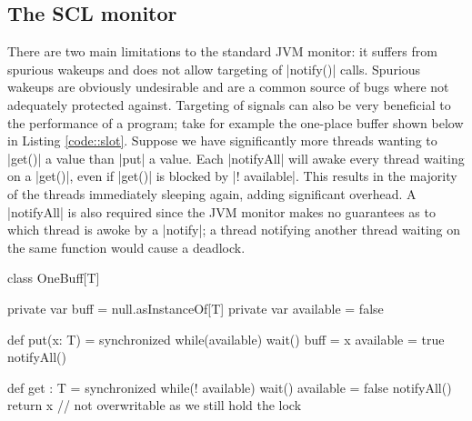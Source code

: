 \subsection{The SCL monitor}\label{section:SCLMonitor}
\inlineCSP

There are two main limitations to the standard JVM monitor: it suffers from spurious wakeups and does not allow targeting of |notify()| calls. Spurious wakeups are obviously undesirable and are a common source of bugs where not adequately protected against. Targeting of signals can also be very beneficial to the performance of a program; take for example the one-place buffer shown below in Listing \ref{code::slot}. Suppose we have significantly more threads wanting to |get()| a value than |put| a value. Each |notifyAll| will awake every thread waiting on a |get()|, even if |get()| is blocked by |! available|. This results in the majority of the threads immediately sleeping again, adding significant overhead. A |notifyAll| is also required since the JVM monitor makes no guarantees as to which thread is awoke by a |notify|; a thread notifying another thread waiting on the same function would cause a deadlock.

\begin{scala}[label=code::slot, caption={A single place buffer as an example of the inefficiency of untargeted signals}]
  class OneBuff[T] {
    private var buff = null.asInstanceOf[T]
    private var available = false

    def put(x: T) = synchronized {
      while(available) wait()
      buff = x
      available = true
      notifyAll()
    }

    def get : T = synchronized {
      while(! available) wait()
      available = false
      notifyAll()
      return x // not overwritable as we still hold the lock
    }
  }
\end{scala}

